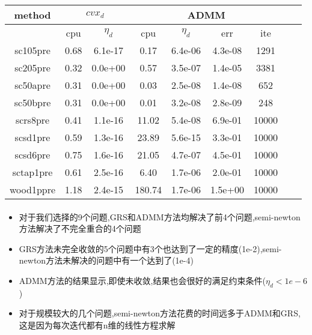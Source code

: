\documentclass[UTF8]{ctexart}
\begin{document}
\begin{tabular}{|c|c|c|c|c|c|c|c|c|}
  \hline
  method& \multicolumn{2}{c|}{$cvx_d$} &\multicolumn{4}{c|}{ADMM}\\
  \hline
  &cpu&$\eta_d$&cpu&$\eta_d$&err&ite\\
  \hline
  sc105pre& 0.68 & 6.1e-17 & 0.17 & 6.4e-06 & 4.3e-08 & 1291\\
  sc205pre&0.32 & 0.0e+00 & 0.57 & 3.5e-07 & 1.4e-05 & 3381\\
  sc50apre&0.31 & 0.0e+00 & 0.03 & 2.5e-08 & 1.4e-08 & 652\\
  sc50bpre&0.31 & 0.0e+00 & 0.01 & 3.2e-08 & 2.8e-09 & 248\\
  scrs8pre&0.41 & 1.1e-16 & 11.02 & 5.4e-08 & 6.9e-01 & 10000\\
  scsd1pre&0.59 & 1.3e-16 & 23.89 & 5.6e-15 & 3.3e-01 & 10000\\
  scsd6pre&0.75 & 1.6e-16 & 21.05 & 4.7e-07 & 4.5e-01 & 10000\\
  sctap1pre&0.61 & 2.5e-16 & 6.40 & 1.7e-06 & 2.0e-01 & 10000\\
  wood1ppre&1.18 & 2.4e-15 & 180.74 & 1.7e-06 & 1.5e+00 & 10000\\
  \hline
\end{tabular}
\paragraph{}
\begin{itemize}
  \item 对于我们选择的9个问题,GRS和ADMM方法均解决了前4个问题,semi-newton方法解决了不完全重合的4个问题
  \item GRS方法未完全收敛的5个问题中有3个也达到了一定的精度(1e-2),semi-newton方法未解决的问题中有一个达到了(1e-4)
  \item ADMM方法的结果显示,即使未收敛,结果也会很好的满足约束条件($\eta_d<1e-6$)
  \item 对于规模较大的几个问题,semi-newton方法花费的时间远多于ADMM和GRS,这是因为每次迭代都有n维的线性方程求解
\end{itemize}
\end{document}
